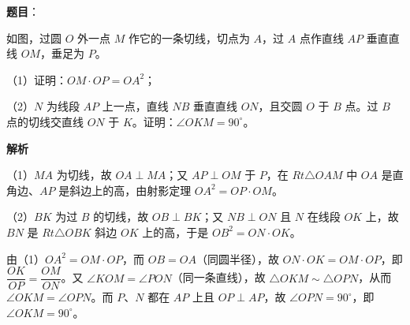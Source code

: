 \begin{answer}

\textbf{题目}：

如图，过圆 $O$ 外一点 $M$ 作它的一条切线，切点为 $A$，过 $A$ 点作直线 $AP$ 垂直直线 $OM$，垂足为 $P$。

（1）证明：$OM\cdot OP=OA^2$；

（2）$N$ 为线段 $AP$ 上一点，直线 $NB$ 垂直直线 $ON$，且交圆 $O$ 于 $B$ 点。过 $B$ 点的切线交直线 $ON$ 于 $K$。证明：$\angle OKM=90^\circ$。
\nopagebreak[4]
\begin{center}\end{center}
\nopagebreak[4]
\textbf{解析}

（1）$MA$ 为切线，故 $OA\perp MA$；又 $AP\perp OM$ 于 $P$，在 $Rt\triangle OAM$ 中 $OA$ 是直角边、$AP$ 是斜边上的高，由射影定理 $OA^2=OP\cdot OM$。

（2）$BK$ 为过 $B$ 的切线，故 $OB\perp BK$；又 $NB\perp ON$ 且 $N$ 在线段 $OK$ 上，故 $BN$ 是 $Rt\triangle OBK$ 斜边 $OK$ 上的高，于是 $OB^2=ON\cdot OK$。

由（1）$OA^2=OM\cdot OP$，而 $OB=OA$（同圆半径），故 $ON\cdot OK=OM\cdot OP$，即 $\dfrac{OK}{OP}=\dfrac{OM}{ON}$。又 $\angle KOM=\angle PON$（同一条直线），故 $\triangle OKM\sim\triangle OPN$，从而 $\angle OKM=\angle OPN$。而 $P$、$N$ 都在 $AP$ 上且 $OP\perp AP$，故 $\angle OPN=90^\circ$，即 $\angle OKM=90^\circ$。


\end{answer}
